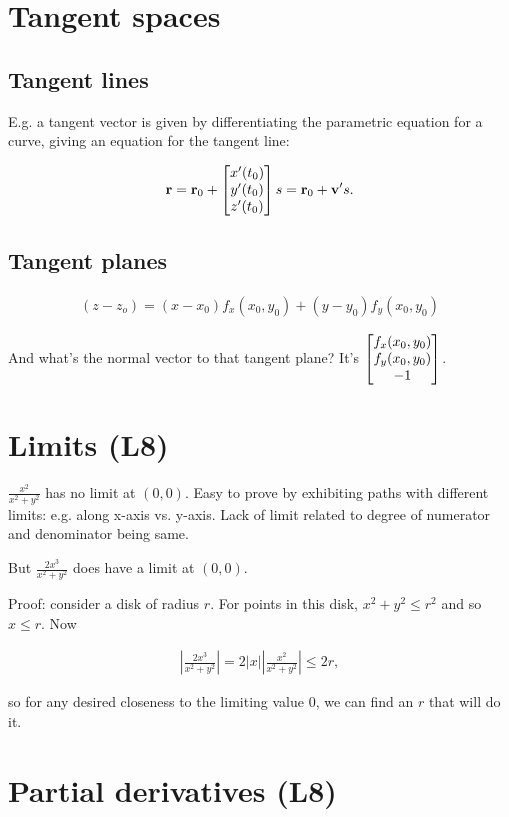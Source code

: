 \documentclass[12pt]{article}
\begin{document}
\section{Tangent spaces}

\subsection*{Tangent lines}
E.g. a tangent vector is given by differentiating the parametric equation for a
curve, giving an equation for the tangent line:

\begin{align*}
  \mathbf{r} = \mathbf{r}_0 + \begin{bmatrix}x'(t_0)\\y'(t_0)\\z'(t_0)\end{bmatrix}s = \mathbf{r}_0 + \mathbf{v}' s.
\end{align*}

\subsection*{Tangent planes}

\begin{align*}
  (z - z_o) = (x - x_0)f_x(x_0, y_0) + (y - y_0)f_y(x_0, y_0)
\end{align*}

And what's the normal vector to that tangent plane? It's
$\begin{bmatrix}f_x(x_0, y_0)\\f_y(x_0, y_0)\\-1\end{bmatrix}$.


\section{Limits (L8)}

$\frac{x^2}{x^2 + y^2}$ has no limit at $(0, 0)$.
Easy to prove by exhibiting paths with different limits: e.g. along x-axis vs. y-axis.
Lack of limit related to degree of numerator and denominator being same.

But $\frac{2x^3}{x^2 + y^2}$ does have a limit at $(0, 0)$.

Proof: consider a disk of radius $r$. For points in this disk, $x^2 + y^2 \leq r^2$ and so $x \leq r$.
Now

\begin{align*}
  \left|\frac{2x^3}{x^2 + y^2}\right| = 2|x|\left|\frac{x^2}{x^2 + y^2}\right| \leq 2r,
\end{align*}

so for any desired closeness to the limiting value 0, we can find an $r$ that will do it.

\section{Partial derivatives (L8)}
\end{document}
